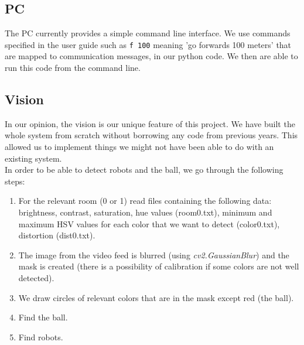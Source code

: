 \documentclass[12pt]{article}
\begin{document}
\subsection{PC}

The PC currently provides a simple command line interface. We use commands specified in the user guide such as \texttt{f 100} meaning 'go forwards 100 meters' that are mapped to communication messages, in our python code. We then are able to run this code from the command line.  

\subsection{Vision}

In our opinion, the vision is our unique feature of this project. We have built the whole system from scratch without borrowing any code from previous years. This allowed us to implement things we might not have been able to do with an existing system. 
\\In order to be able to detect robots and the ball, we go through the following steps:

\begin{enumerate}
\item For the relevant room (0 or 1) read files containing the following data: brightness, contrast,     saturation, hue values (room0.txt), minimum and maximum HSV values for each color that we want to detect (color0.txt), distortion (dist0.txt). 
\item The image from the video feed is blurred (using \textit{cv2.GaussianBlur}) and the mask is created (there is a possibility of calibration if some colors are not well detected).
\item We draw circles of relevant colors that are in the mask except red (the ball).
\item Find the ball.
\item Find robots.
\end{enumerate}
\end{document}
